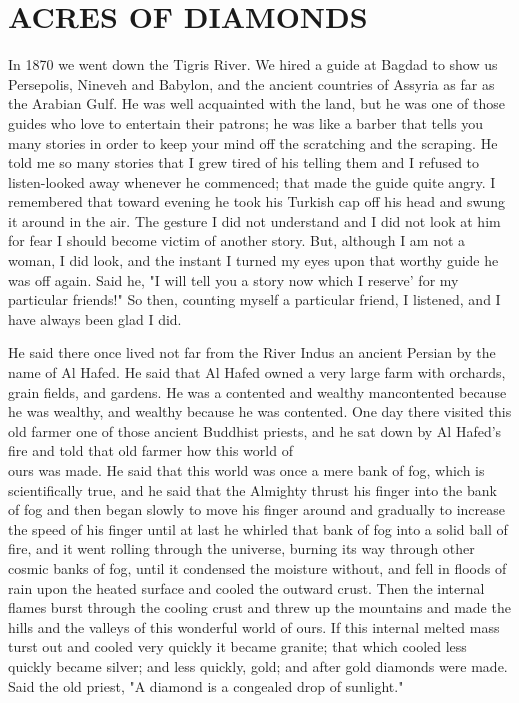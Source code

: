 \documentclass[10pt]{article}
\begin{document}
\section*{ACRES OF DIAMONDS }
In 1870 we went down the Tigris River. We hired a guide at Bagdad to show us Persepolis, Nineveh and Babylon, and the ancient countries of Assyria as far as the Arabian Gulf. He was well acquainted with the land, but he was one of those guides who love to entertain their patrons; he was like a barber that tells you many stories in order to keep your mind off the scratching and the scraping. He told me so many stories that I grew tired of his telling them and I refused to listen-looked away whenever he commenced; that made the guide quite angry. I remembered that toward evening he took his Turkish cap off his head and swung it around in the air. The gesture I did not understand and I did not look at him for fear I should become victim of another story. But, although I am not a woman, I did look, and the instant I turned my eyes upon that worthy guide he was off again. Said he, "I will tell you a story now which I reserve' for my particular friends!" So then, counting myself a particular friend, I listened, and I have always been glad I did.

He said there once lived not far from the River Indus an ancient Persian by the name of Al Hafed. He said that Al Hafed owned a very large farm with orchards, grain fields, and gardens. He was a contented and wealthy mancontented because he was wealthy, and wealthy because he was contented. One day there visited this old farmer one of those ancient Buddhist priests, and he sat down by Al Hafed's fire and told that old farmer how this world of\\
ours was made. He said that this world was once a mere bank of fog, which is scientifically true, and he said that the Almighty thrust his finger into the bank of fog and then began slowly to move his finger around and gradually to increase the speed of his finger until at last he whirled that bank of fog into a solid ball of fire, and it went rolling through the universe, burning its way through other cosmic banks of fog, until it condensed the moisture without, and fell in floods of rain upon the heated surface and cooled the outward crust. Then the internal flames burst through the cooling crust and threw up the mountains and made the hills and the valleys of this wonderful world of ours. If this internal melted mass turst out and cooled very quickly it became granite; that which cooled less quickly became silver; and less quickly, gold; and after gold diamonds were made. Said the old priest, "A diamond is a congealed drop of sunlight."
\end{document}
